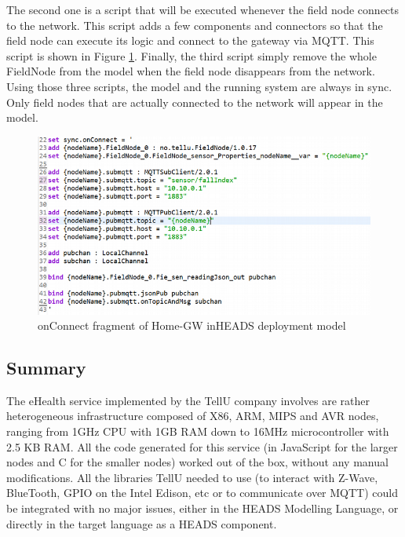 The second one is a script that will be executed whenever the field node connects to the network. This script adds a few components and connectors so that the field node can execute its logic and connect to the gateway via MQTT. This script is shown in Figure \ref{fig:fig7}. 
Finally, the third script simply remove the whole FieldNode from the model when the field node disappears from the network. Using those three scripts, the model and the running system are always in sync. Only field nodes that are actually connected to the network will appear in the model.%

\begin{figure}[h]
	\centering
	\includegraphics[width=1\linewidth]{figures/fig7}
	\caption{onConnect fragment of Home-GW inHEADS deployment model}
	\label{fig:fig7}
\end{figure}



\subsection{Summary}
The eHealth service implemented by the TellU company involves are rather heterogeneous infrastructure composed of X86, ARM, MIPS and AVR nodes, ranging from 1GHz CPU with 1GB RAM down to 16MHz microcontroller with 2.5 KB RAM. All the code generated for this service (in JavaScript for the larger nodes and C for the smaller nodes) worked out of the box, without any manual modifications. All the libraries TellU needed to use (to interact with Z-Wave, BlueTooth, GPIO on the Intel Edison, etc or to communicate over MQTT) could be integrated with no major issues, either in the HEADS Modelling Language, or directly in the target language as a HEADS component.  

